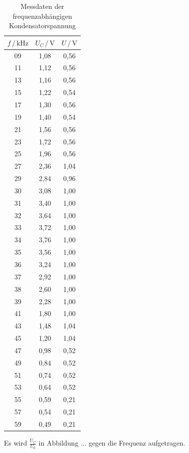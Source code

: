 \begin{table}
  \centering
  \caption{Messdaten der frequenzabhängigen Kondensatorspannung}
  \label{tab:Messdaten2}
  \begin{tabular}{c c c}
  \toprule
  $f \,/\, \si{\kilo\hertz}$ & $U_C \,/\, \si{\volt}$ & $U \,/\, \si{\volt}$ \\
  \midrule
  09 & 1,08 & 0,56\\
  11 & 1,12 & 0,56\\
  13 & 1,16 & 0,56\\
  15 & 1,22 & 0,54\\
  17 & 1,30 & 0,56\\
  19 & 1,40 & 0,54\\
  21 & 1,56 & 0,56\\
  23 & 1,72 & 0,56\\
  25 & 1,96 & 0,56\\
  27 & 2,36 & 1,04\\
  29 & 2,84 & 0,96\\
  30 & 3,08 & 1,00\\
  31 & 3,40 & 1,00\\
  32 & 3,64 & 1,00\\
  33 & 3,72 & 1,00\\
  34 & 3,76 & 1,00\\
  35 & 3,56 & 1,00\\
  36 & 3,24 & 1,00\\
  37 & 2,92 & 1,00\\
  38 & 2,60 & 1,00\\
  39 & 2,28 & 1,00\\
  41 & 1,80 & 1,00\\
  43 & 1,48 & 1,04\\
  45 & 1,20 & 1,04\\
  47 & 0,98 & 0,52\\
  49 & 0,84 & 0,52\\
  51 & 0,74 & 0,52\\
  53 & 0,64 & 0,52\\
  55 & 0,59 & 0,21\\
  57 & 0,54 & 0,21\\
  59 & 0,49 & 0,21\\
  \bottomrule
  \end{tabular}
  \end{table} 

Es wird $\frac{U_C}{U_0}$ in Abbildung ... gegen die Frequenz aufgetragen. 

